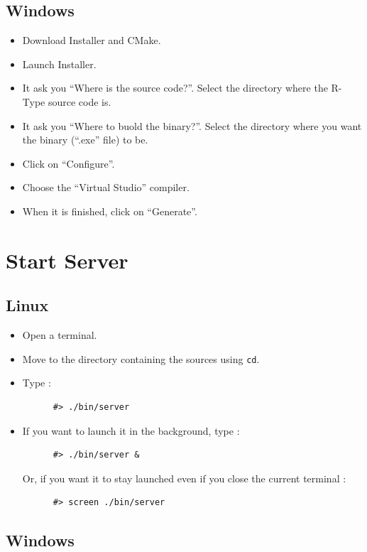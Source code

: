 \documentclass{koala-fr}
\begin{document}
\section{Windows}


\begin{itemize}
  \item Download Installer and CMake.
  \item Launch Installer.
  \item It ask you ``Where is the source code?''. Select the directory where the R-Type source code is.
  \item It ask you ``Where to buold the binary?''. Select the directory where you want the binary (``.exe'' file) to be.
  \item Click on ``Configure''.
  \item Choose the ``Virtual Studio'' compiler.
  \item When it is finished, click on ``Generate''.
\end{itemize}


\chapter{Start Server}

\section{Linux}

\begin{itemize}
  \item Open a terminal.
  \item Move to the directory containing the sources using \texttt{cd}.
  \item Type :
    \begin{lstlisting}
      #> ./bin/server
    \end{lstlisting}
  \item If you want to launch it in the background, type :
    \begin{lstlisting}
      #> ./bin/server &
    \end{lstlisting}
    Or, if you want it to stay launched even if you close the current terminal :
    \begin{lstlisting}
      #> screen ./bin/server
    \end{lstlisting}
\end{itemize}

\section{Windows}
\end{document}

